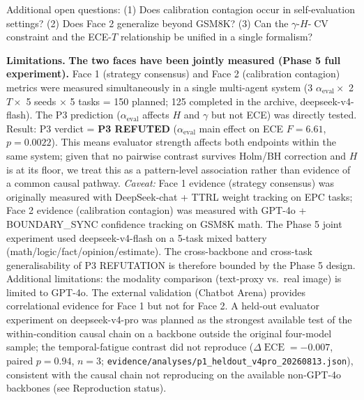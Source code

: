 \documentclass[11pt]{article}
\DeclareMathOperator{\CV}{CV}
\DeclareMathOperator{\ECE}{ECE}
\begin{document}
Additional open questions: (1) Does calibration contagion occur in self-evaluation settings? (2) Does Face 2 generalize beyond GSM8K? (3) Can the $\gamma$-$H$-$\CV$ constraint and the ECE-$T$ relationship be unified in a single formalism?

\textbf{Limitations.} \textbf{The two faces have been jointly measured (Phase 5 full experiment).} Face 1 (strategy consensus) and Face 2 (calibration contagion) metrics were measured simultaneously in a single multi-agent system (3 $\alpha_{\text{eval}} \times$ 2 $T \times$ 5 seeds $\times$ 5 tasks = 150 planned; 125 completed in the archive, deepseek-v4-flash). The P3 prediction ($\alpha_{\text{eval}}$ affects $H$ and $\gamma$ but not ECE) was directly tested. Result: P3 verdict = \textbf{P3 REFUTED} ($\alpha_{\text{eval}}$ main effect on ECE $F = 6.61$, $p = 0.0022$). This means evaluator strength affects both endpoints within the same system; given that no pairwise contrast survives Holm/BH correction and $H$ is at its floor, we treat this as a pattern-level association rather than evidence of a common causal pathway. \emph{Caveat:} Face 1 evidence (strategy consensus) was originally measured with DeepSeek-chat + TTRL weight tracking on EPC tasks; Face 2 evidence (calibration contagion) was measured with GPT-4o + BOUNDARY\_SYNC confidence tracking on GSM8K math. The Phase 5 joint experiment used deepseek-v4-flash on a 5-task mixed battery (math/logic/fact/opinion/estimate). The cross-backbone and cross-task generalisability of P3 REFUTATION is therefore bounded by the Phase 5 design. Additional limitations: the modality comparison (text-proxy vs.\ real image) is limited to GPT-4o. The external validation (Chatbot Arena) provides correlational evidence for Face 1 but not for Face 2. A held-out evaluator experiment on deepseek-v4-pro was planned as the strongest available test of the within-condition causal chain on a backbone outside the original four-model sample; the temporal-fatigue contrast did not reproduce ($\Delta\ECE = -0.007$, paired $p = 0.94$, $n = 3$; \texttt{evidence/analyses/p1\_heldout\_v4pro\_20260813.json}), consistent with the causal chain not reproducing on the available non-GPT-4o backbones (see Reproduction status).
\end{document}
